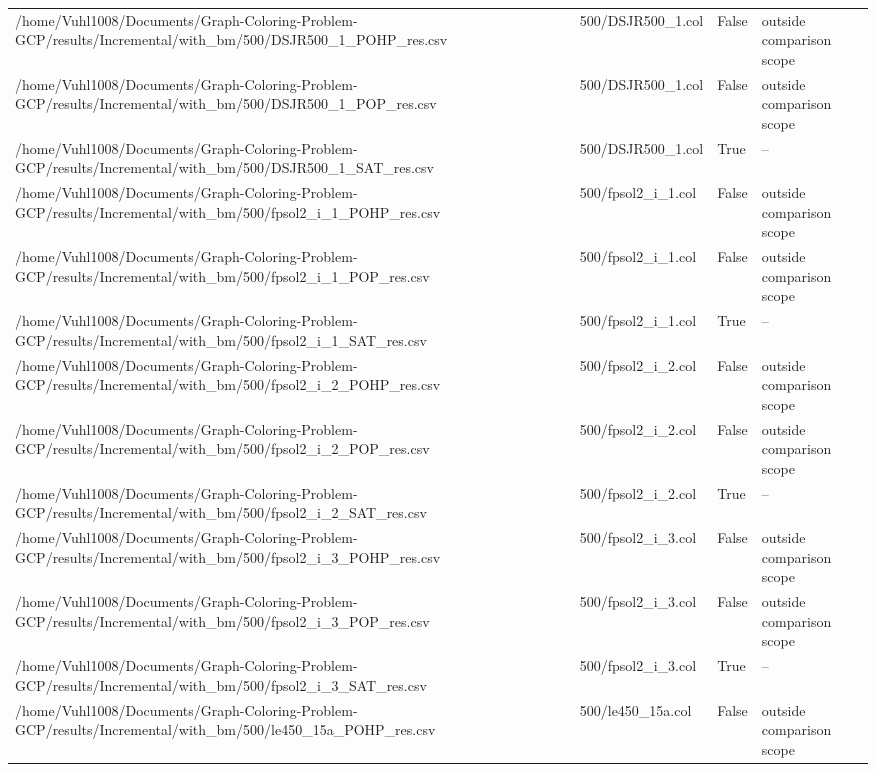 \begin{table}[htbp]
\begin{tabular}{llll}
/home/Vuhl1008/Documents/Graph-Coloring-Problem-GCP/results/Incremental/with\_bm/500/DSJR500\_1\_POHP\_res.csv & 500/DSJR500\_1.col & False & outside comparison scope \\
/home/Vuhl1008/Documents/Graph-Coloring-Problem-GCP/results/Incremental/with\_bm/500/DSJR500\_1\_POP\_res.csv & 500/DSJR500\_1.col & False & outside comparison scope \\
/home/Vuhl1008/Documents/Graph-Coloring-Problem-GCP/results/Incremental/with\_bm/500/DSJR500\_1\_SAT\_res.csv & 500/DSJR500\_1.col & True & -- \\
/home/Vuhl1008/Documents/Graph-Coloring-Problem-GCP/results/Incremental/with\_bm/500/fpsol2\_i\_1\_POHP\_res.csv & 500/fpsol2\_i\_1.col & False & outside comparison scope \\
/home/Vuhl1008/Documents/Graph-Coloring-Problem-GCP/results/Incremental/with\_bm/500/fpsol2\_i\_1\_POP\_res.csv & 500/fpsol2\_i\_1.col & False & outside comparison scope \\
/home/Vuhl1008/Documents/Graph-Coloring-Problem-GCP/results/Incremental/with\_bm/500/fpsol2\_i\_1\_SAT\_res.csv & 500/fpsol2\_i\_1.col & True & -- \\
/home/Vuhl1008/Documents/Graph-Coloring-Problem-GCP/results/Incremental/with\_bm/500/fpsol2\_i\_2\_POHP\_res.csv & 500/fpsol2\_i\_2.col & False & outside comparison scope \\
/home/Vuhl1008/Documents/Graph-Coloring-Problem-GCP/results/Incremental/with\_bm/500/fpsol2\_i\_2\_POP\_res.csv & 500/fpsol2\_i\_2.col & False & outside comparison scope \\
/home/Vuhl1008/Documents/Graph-Coloring-Problem-GCP/results/Incremental/with\_bm/500/fpsol2\_i\_2\_SAT\_res.csv & 500/fpsol2\_i\_2.col & True & -- \\
/home/Vuhl1008/Documents/Graph-Coloring-Problem-GCP/results/Incremental/with\_bm/500/fpsol2\_i\_3\_POHP\_res.csv & 500/fpsol2\_i\_3.col & False & outside comparison scope \\
/home/Vuhl1008/Documents/Graph-Coloring-Problem-GCP/results/Incremental/with\_bm/500/fpsol2\_i\_3\_POP\_res.csv & 500/fpsol2\_i\_3.col & False & outside comparison scope \\
/home/Vuhl1008/Documents/Graph-Coloring-Problem-GCP/results/Incremental/with\_bm/500/fpsol2\_i\_3\_SAT\_res.csv & 500/fpsol2\_i\_3.col & True & -- \\
/home/Vuhl1008/Documents/Graph-Coloring-Problem-GCP/results/Incremental/with\_bm/500/le450\_15a\_POHP\_res.csv & 500/le450\_15a.col & False & outside comparison scope \\

\end{tabular}
\end{table}

